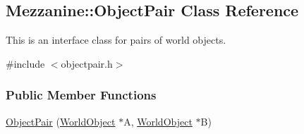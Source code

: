 \hypertarget{classMezzanine_1_1ObjectPair}{
\subsection{Mezzanine::ObjectPair Class Reference}
\label{classMezzanine_1_1ObjectPair}
}


This is an interface class for pairs of world objects.  




{\ttfamily \#include $<$objectpair.h$>$}

\subsubsection*{Public Member Functions}
\begin{DoxyCompactItemize}
\item 
\hypertarget{classMezzanine_1_1ObjectPair_ad17c0a1aabd7ff5a76c5040d518941ca}{
\hyperlink{classMezzanine_1_1ObjectPair_ad17c0a1aabd7ff5a76c5040d518941ca}{ObjectPair} (\hyperlink{classMezzanine_1_1WorldObject}{WorldObject} $\ast$A, \hyperlink{classMezzanine_1_1WorldObject}{WorldObject} $\ast$B)}
\label{classMezzanine_1_1ObjectPair_ad17c0a1aabd7ff5a76c5040d518941ca}


\end{DoxyCompactItemize}
